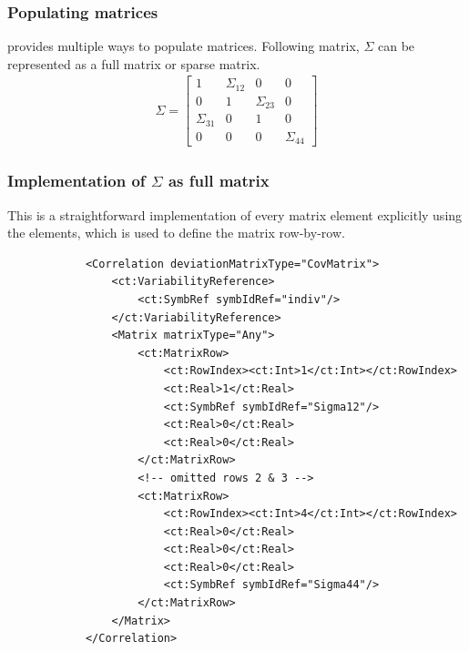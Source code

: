 \subsubsection{Populating matrices}
\pharmml provides multiple ways to populate matrices. 
Following matrix, $\Sigma$ can be represented as a full matrix or sparse matrix. 
\label{subsec:matrixType}
\begin{align}
\Sigma = 
  \begin{bmatrix} 
  1 & \Sigma_{12} & 0 & 0 \\
  0 & 1 & \Sigma_{23} & 0 \\
  \Sigma_{31} & 0 & 1 & 0 \\
  0 & 0 & 0 & \Sigma_{44} \nonumber \end{bmatrix} 
\end{align}

\subsubsection{Implementation of $\Sigma$ as full matrix}
This is a straightforward implementation of every matrix element explicitly using
the  elements, which is used to define the matrix row-by-row.  
\lstset{language=XML}
\begin{lstlisting}
            <Correlation deviationMatrixType="CovMatrix">
                <ct:VariabilityReference>
                    <ct:SymbRef symbIdRef="indiv"/>
                </ct:VariabilityReference>
                <Matrix matrixType="Any">
                    <ct:MatrixRow>
                        <ct:RowIndex><ct:Int>1</ct:Int></ct:RowIndex>
                        <ct:Real>1</ct:Real>
                        <ct:SymbRef symbIdRef="Sigma12"/>
                        <ct:Real>0</ct:Real>
                        <ct:Real>0</ct:Real>
                    </ct:MatrixRow>
                    <!-- omitted rows 2 & 3 -->
                    <ct:MatrixRow>
                        <ct:RowIndex><ct:Int>4</ct:Int></ct:RowIndex>
                        <ct:Real>0</ct:Real>
                        <ct:Real>0</ct:Real>
                        <ct:Real>0</ct:Real>
                        <ct:SymbRef symbIdRef="Sigma44"/>
                    </ct:MatrixRow>
                </Matrix>
            </Correlation> 
\end{lstlisting}
 

